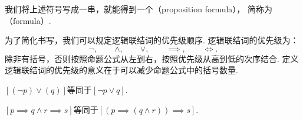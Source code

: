 我们将上述符号写成一串，就能得到一个（proposition formula），
简称为（formula）.



为了简化书写，我们可以规定逻辑联结词的优先级顺序.
逻辑联结词的优先级为：\[
	\neg, \qquad
	\land, \qquad
	\lor, \qquad
	\implies, \qquad
	\iff.
\]
除非有括号，否则按照命题公式从左到右，按照优先级从高到低的次序结合.
定义逻辑联结词的优先级的意义在于可以减少命题公式中的括号数量.

\begin{example}
\([(\neg p) \lor (q)]\)等同于\([\neg p \lor q]\).
\end{example}

\begin{example}
\([p \implies q \land r \implies s]\)等同于\([(p \implies (q \land r)) \implies s]\).
\end{example}

